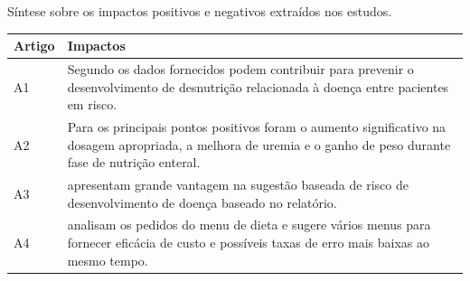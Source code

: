 \begin{quadro}[htb]
\caption{\label{quadro_ImpactosPositivos}Síntese sobre os impactos positivos e negativos extraídos nos estudos.}
\label{}
\begin{tabular}{|p{}|p{}|}
	\hline
	\textbf{Artigo}   &   \textbf{Impactos}\\ \hline
	A1  &  Segundo \citeonline{paulsen2018_1} os dados fornecidos podem contribuir para prevenir o desenvolvimento de desnutrição relacionada à doença entre pacientes em risco.\\ \hline
	A2  &  Para \citeonline{alrifai2017} os principais pontos positivos foram o aumento significativo na dosagem apropriada, a melhora de uremia e o ganho de peso durante fase de nutrição enteral.\\ \hline
	A3  &  \citeonline{cruz2017} apresentam grande vantagem na sugestão baseada de risco de desenvolvimento de doença baseado no relatório.\\ \hline
	A4  & \citeonline{ileri2019} analisam os pedidos do menu de dieta e sugere vários menus para fornecer eficácia de custo e possíveis taxas de erro mais baixas ao mesmo tempo.\\ \hline
\end{tabular}
\end{quadro}
\newpage
